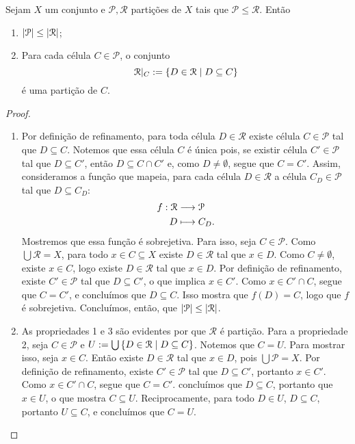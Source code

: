 \begin{prop}
Sejam $X$ um conjunto e $\mathcal P,\mathcal R$ partições de $X$ tais que $\mathcal P \leq \mathcal R$. Então
	\begin{enumerate}
	\item $\left\vert{\mathcal P}\right\vert \leq \left\vert{\mathcal R}\right\vert$;
	\item Para cada célula $C \in \mathcal P$, o conjunto
		\begin{equation*}
		\mathcal R|_C := \left\{D \in \mathcal R \;\middle\vert\; D \subseteq C \right\}
		\end{equation*}
é uma partição de $C$.
	\end{enumerate}
\end{prop}
\begin{proof}
	\begin{enumerate}
	\item Por definição de refinamento, para toda célula $D \in \mathcal R$ existe célula $C \in \mathcal P$ tal que $D \subseteq C$. Notemos que essa célula $C$ é única pois, se existir célula $C' \in \mathcal P$ tal que $D \subseteq C'$, então $D \subseteq C \cap C'$ e, como $D \neq \emptyset$, segue que $C =C'$. Assim, consideramos a função que mapeia, para cada célula $D \in \mathcal R$ a célula $C_D \in \mathcal P$ tal que $D \subseteq C_D$:
	\begin{align*}
	{f}: {\mathcal R} &\longrightarrow {\mathcal P} \\{D} &\longmapsto {C_D}.
	\end{align*}
Mostremos que essa função é sobrejetiva. Para isso, seja $C \in \mathcal P$. Como $\bigcup \mathcal R = X$, para todo $x \in C \subseteq X$ existe $D \in \mathcal R$ tal que $x \in D$. Como $C \neq \emptyset$, existe $x \in C$, logo existe $D \in \mathcal R$ tal que $x \in D$. Por definição de refinamento, existe $C' \in \mathcal P$ tal que $D \subseteq C'$, o que implica $x \in C'$. Como $x \in C' \cap C$, segue que $C=C'$, e concluímos que $D \subseteq C$. Isso mostra que $f(D)=C$, logo que $f$ é sobrejetiva. Concluímos, então, que $\left\vert{\mathcal P}\right\vert \leq \left\vert{\mathcal R}\right\vert$.
	
	\item As propriedades 1 e 3 são evidentes por que $\mathcal R$ é partição. Para a propriedade 2, seja $C \in \mathcal P$ e $U := \bigcup \left\{D \in \mathcal R \;\middle\vert\; D \subseteq C \right\}$. Notemos que $C=U$. Para mostrar isso, seja $x \in C$. Então existe $D \in \mathcal R$ tal que $x \in D$, pois $\bigcup \mathcal P=X$. Por definição de refinamento, existe $C' \in \mathcal P$ tal que $D \subseteq C'$, portanto $x \in C'$. Como $x \in C' \cap C$, segue que $C=C'$. concluímos que $D \subseteq C$, portanto que $x \in U$, o que mostra $C \subseteq U$. Reciprocamente, para todo $D \in U$, $D \subseteq C$, portanto $U \subseteq C$, e concluímos que $C=U$.
	\end{enumerate}
\end{proof}

